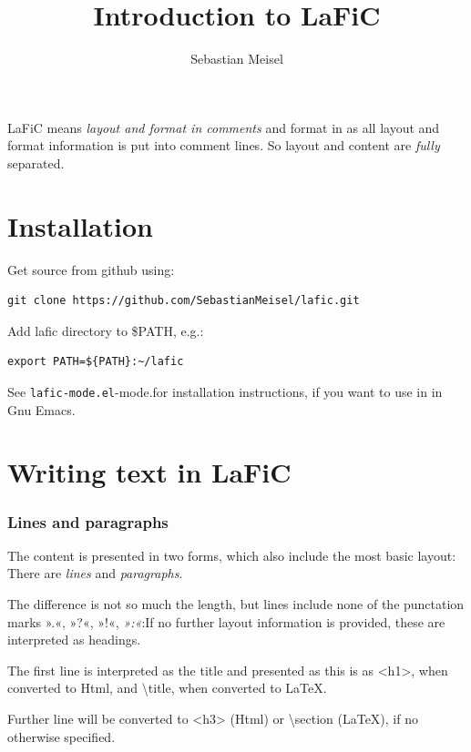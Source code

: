\documentclass{article}
\title{Introduction to LaFiC}
\author{Sebastian Meisel}
\begin{document}
\maketitle


LaFiC means \textit{layout and format in comments} and format in as all layout and
format information is put into comment lines. So layout and
content are \emph{fully} separated.

\part{Installation}

Get source from github using:

\begin{verbatim}
git clone https://github.com/SebastianMeisel/lafic.git

\end{verbatim}

Add lafic directory to \$PATH, e.g.:

\begin{verbatim}
export PATH=${PATH}:~/lafic

\end{verbatim}

See \texttt{lafic-mode.el}-mode.for installation instructions, if you want
to use in in Gnu Emacs.

\part{Writing text in LaFiC}

\section{Lines and paragraphs}

The content is presented in two forms, which also include
the most basic layout: There are \emph{lines} and \emph{paragraphs}.

The difference is not so much the length, but lines include
none of the punctation marks ».«, »?«, »!«, \emph{»:«}:If no
further layout information is provided, these are
interpreted as headings.

The first line is interpreted as the title and presented as
this is as <h1>, when converted to Html, and \textbackslash title, when 
converted to \LaTeX.

Further line will be converted to <h3> (Html) or \textbackslash section
(\LaTeX), if no otherwise specified.
\end{document}
